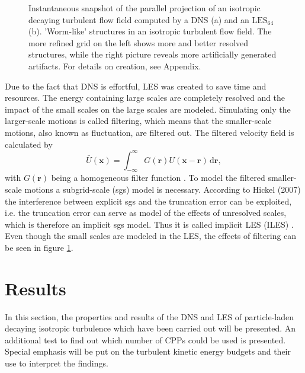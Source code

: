 \documentclass[11pt,a4paper,openany,oneside,parskip=half*]{article}
\renewcommand*\vec[1]{\boldsymbol{#1}}
\begin{document}
\begin{figure}[h]
\begin{minipage}[t]{0.5\textwidth}
        \label{64_velocity}
    \end{minipage}
    \captionsetup{width=0.97\linewidth}
\caption{Instantaneous snapshot of the parallel projection of an isotropic decaying turbulent flow field computed by a DNS (a) and an $\mathrm{LES_{64}}$ (b). 'Worm-like' structures in an isotropic turbulent flow field. The more refined grid on the left shows more and better resolved structures, while the right picture reveals more artificially generated artifacts. For details on creation, see Appendix.}
\label{comparisonLESDNS}
\end{figure}
Due to the fact that DNS is effortful, LES was created to save time and resources. The energy containing large scales are completely resolved and the impact of the small scales on the large scales are modeled.
\newline
Simulating only the larger-scale motions is called filtering, which means that the smaller-scale motions, also known as fluctuation, are filtered out. The filtered velocity field is calculated by 
\begin{equation}
\bar U(\vec{x}) = \int_{-\infty}^{\infty} G(\vec{r})U(\vec{x} - \vec{r})  \, \mathrm{d}\vec{r},
\end{equation}
with $G(\vec{r}) $ being a homogeneous filter function \cite{turbulentFlows}. To model the filtered smaller-scale motions a subgrid-scale (sgs) model is necessary. According to Hickel (2007) the interference between explicit sgs and the truncation error can be exploited, i.e. the truncation error can serve as model of the effects of unresolved scales, which is therefore an implicit sgs model. Thus it is called implicit LES (ILES) \cite{implicitLES}.
\newline
Even though the small scales are modeled in the LES, the effects of filtering can be seen in figure \ref{comparisonLESDNS}.
\newline
\pagebreak
\section{Results}
In this section, the properties and results of the DNS and LES of particle-laden decaying isotropic turbulence which have been carried out will be presented. An additional test to find out which  number of CPPs could be used is presented. Special emphasis will be put on the turbulent kinetic energy budgets and their use to interpret the findings.
\newline
\end{document}
